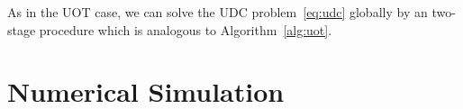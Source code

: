 \documentclass{ifacconf}
\newcommand{\calN}{{\mathcal N}}
\begin{document}
As in the UOT case, we can solve the UDC problem~\eqref{eq:udc} globally by an two-stage procedure which is analogous to Algorithm~\ref{alg:uot}. 





\section{Numerical Simulation}\label{section:simmulation}

\end{document}
